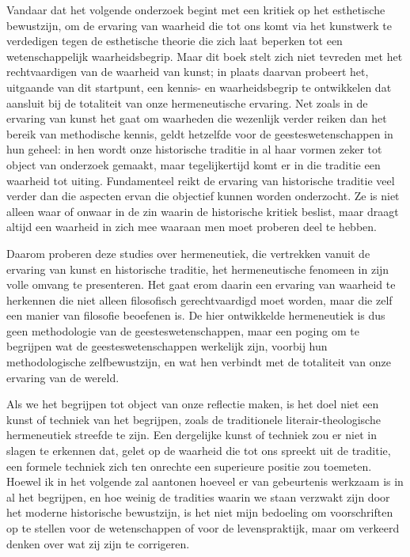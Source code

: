 Vandaar dat het volgende onderzoek begint met een kritiek op het esthetische bewustzijn, om de ervaring van waarheid die tot ons komt via het kunstwerk te verdedigen tegen de esthetische theorie die zich laat beperken tot een wetenschappelijk waarheidsbegrip. Maar dit boek stelt zich niet tevreden met het rechtvaardigen van de waarheid van kunst; in plaats daarvan probeert het, uitgaande van dit startpunt, een kennis- en waarheidsbegrip te ontwikkelen dat aansluit bij de totaliteit van onze hermeneutische ervaring. Net zoals in de ervaring van kunst het gaat om waarheden die wezenlijk verder reiken dan het bereik van methodische kennis, geldt hetzelfde voor de geesteswetenschappen in hun geheel: in hen wordt onze historische traditie in al haar vormen zeker tot object van onderzoek gemaakt, maar tegelijkertijd komt er in die traditie een waarheid tot uiting. Fundamenteel reikt de ervaring van historische traditie veel verder dan die aspecten ervan die objectief kunnen worden onderzocht. Ze is niet alleen waar of onwaar in de zin waarin de historische kritiek beslist, maar draagt altijd een waarheid in zich mee waaraan men moet proberen deel te hebben.

Daarom proberen deze studies over hermeneutiek, die vertrekken vanuit de ervaring van kunst en historische traditie, het hermeneutische fenomeen in zijn volle omvang te presenteren. Het gaat erom daarin een ervaring van waarheid te herkennen die niet alleen filosofisch gerechtvaardigd moet worden, maar die zelf een manier van filosofie beoefenen is. De hier ontwikkelde hermeneutiek is dus geen methodologie van de geesteswetenschappen, maar een poging om te begrijpen wat de geesteswetenschappen werkelijk zijn, voorbij hun methodologische zelfbewustzijn, en wat hen verbindt met de totaliteit van onze ervaring van de wereld.

Als we het begrijpen tot object van onze reflectie maken, is het doel niet een kunst of techniek van het begrijpen, zoals de traditionele literair-theologische hermeneutiek streefde te zijn. Een dergelijke kunst of techniek zou er niet in slagen te erkennen dat, gelet op de waarheid die tot ons spreekt uit de traditie, een formele techniek zich ten onrechte een superieure positie zou toemeten. Hoewel ik in het volgende zal aantonen hoeveel er van gebeurtenis werkzaam is in al het begrijpen, en hoe weinig de tradities waarin we staan verzwakt zijn door het moderne historische bewustzijn, is het niet mijn bedoeling om voorschriften op te stellen voor de wetenschappen of voor de levenspraktijk, maar om verkeerd denken over wat zij zijn te corrigeren.

